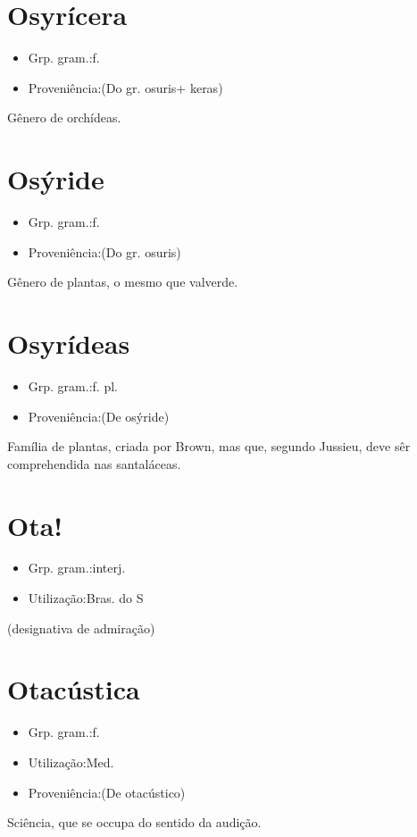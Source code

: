\section{Osyrícera}
\begin{itemize}
\item {Grp. gram.:f.}
\end{itemize}
\begin{itemize}
\item {Proveniência:(Do gr. \textunderscore osuris\textunderscore  + \textunderscore keras\textunderscore )}
\end{itemize}
Gênero de orchídeas.
\section{Osýride}
\begin{itemize}
\item {Grp. gram.:f.}
\end{itemize}
\begin{itemize}
\item {Proveniência:(Do gr. \textunderscore osuris\textunderscore )}
\end{itemize}
Gênero de plantas, o mesmo que \textunderscore valverde\textunderscore .
\section{Osyrídeas}
\begin{itemize}
\item {Grp. gram.:f. pl.}
\end{itemize}
\begin{itemize}
\item {Proveniência:(De \textunderscore osýride\textunderscore )}
\end{itemize}
Família de plantas, criada por Brown, mas que, segundo Jussieu, deve sêr comprehendida nas santaláceas.
\section{Ota!}
\begin{itemize}
\item {Grp. gram.:interj.}
\end{itemize}
\begin{itemize}
\item {Utilização:Bras. do S}
\end{itemize}
(designativa de \textunderscore admiração\textunderscore )
\section{Otacústica}
\begin{itemize}
\item {Grp. gram.:f.}
\end{itemize}
\begin{itemize}
\item {Utilização:Med.}
\end{itemize}
\begin{itemize}
\item {Proveniência:(De \textunderscore otacústico\textunderscore )}
\end{itemize}
Sciência, que se occupa do sentido da audição.
